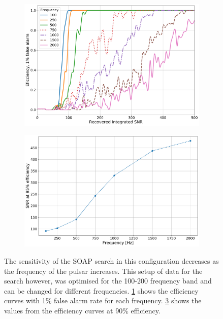 \begin{figure}
	
	\begin{subfigure}[h]{0.9\linewidth}
			\centering
			\includegraphics[width=\linewidth]{C3_soap/snr_freq_eff.pdf}
			\caption{}
			\label{viterbi:sens:eff}
	\end{subfigure}

	\begin{subfigure}[h]{0.9\linewidth}
		\centering
		\includegraphics[width=\linewidth]{C3_soap/snr_with_freq.pdf}
		\caption{}
		\label{viterbi:sens:snrfreq}
	\end{subfigure}

\caption{The sensitivity of the SOAP search in this configuration decreases as the frequency of the pulsar increases. This setup of data for the search however, was optimised for the 100-200 frequency band and can be changed for different frequencies. \ref{viterbi:sens:eff} shows the efficiency curves with 1\% false alarm rate for each frequency. \ref{viterbi:sens:snrfreq} shows the values from the efficiency curves at 90\% efficiency.}

\end{figure}


